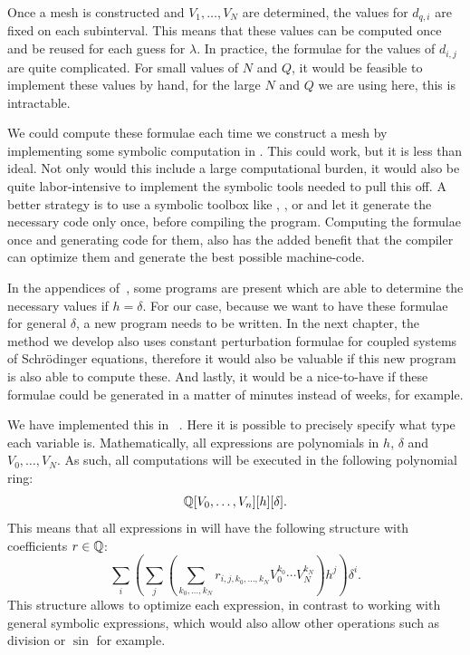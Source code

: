 Once a mesh is constructed and $V_1, \dots, V_{N}$ are determined, the values for $d_{q, i}$ are fixed on each subinterval. This means that these values can be computed once and be reused for each guess for $\lambda$. In practice, the formulae for the values of $d_{i, j}$ are quite complicated. For small values of $N$ and $Q$, it would be feasible to implement these values by hand, for the large $N$ and $Q$ we are using here, this is intractable.

We could compute these formulae each time we construct a mesh by implementing some symbolic computation in \cpp{}. This could work, but it is less than ideal. Not only would this include a large computational burden, it would also be quite labor-intensive to implement the symbolic tools needed to pull this off. A better strategy is to use a symbolic toolbox like \maple{}, \mathematica{}, or \sage{} and let it generate the necessary \cpp{} code only once, before compiling the program. Computing the formulae once and generating code for them, also has the added benefit that the \cpp{} compiler can optimize them and generate the best possible machine-code.

In the appendices of~\cite{ledoux_study_2007}, some \maple{} programs are present which are able to determine the necessary values if $h = \delta$. For our case, because we want to have these formulae for general $\delta$, a new program needs to be written. In the next chapter, the method we develop also uses constant perturbation formulae for coupled systems of Schrödinger equations, therefore it would also be valuable if this new program is also able to compute these. And lastly, it would be a nice-to-have if these formulae could be generated in a matter of minutes instead of weeks, for example.

We have implemented this in \sage{}~\cite{sagemath}. Here it is possible to precisely specify what type each variable is. Mathematically, all expressions are polynomials in $h$, $\delta$ and $V_0, \dots, V_N$. As such, all computations will be executed in the following polynomial ring:
$$
    \mathbb{Q}[V_0, \dots, V_n][h][\delta]\text{.}
$$
This means that all expressions in \sage{} will have the following structure with coefficients $r \in \mathbb{Q}$:
$$
    \sum_i \left(\sum_j \left( \sum_{k_0,\dots, k_N} r_{i,j,k_0,\dots,k_N} V_0^{k_0} \cdots V_N^{k_N}  \right)h^j \right) \delta^i\text{.}
$$
This structure allows \sage{} to optimize each expression, in contrast to working with general symbolic expressions, which would also allow other operations such as division or $\sin$ for example.

